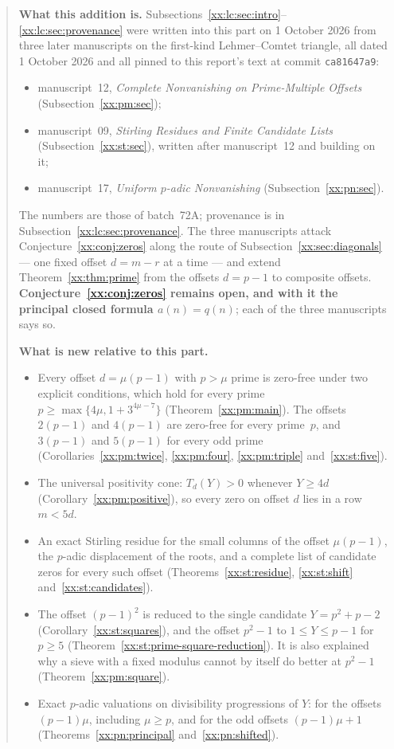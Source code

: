 \documentclass[11pt,a4paper]{article}
\numberwithin{equation}{section}
\theoremstyle{definition}
\theoremstyle{remark}
\theoremstyle{plain}
\begin{document}
\begin{quote}\small
\textbf{What this addition is.}
Subsections~\ref{xx:lc:sec:intro}--\ref{xx:lc:sec:provenance} were written
into this part on 1 October 2026 from three later manuscripts on the
first-kind Lehmer--Comtet triangle, all dated 1 October 2026 and all pinned to
this report's text at commit \texttt{ca81647a9}:
\begin{itemize}[leftmargin=1.4em,itemsep=1pt]
\item manuscript~12, \emph{Complete Nonvanishing on Prime-Multiple Offsets}
 (Subsection~\ref{xx:pm:sec});
\item manuscript~09, \emph{Stirling Residues and Finite Candidate Lists}
 (Subsection~\ref{xx:st:sec}), written after manuscript~12 and building on it;
\item manuscript~17, \emph{Uniform $p$-adic Nonvanishing}
 (Subsection~\ref{xx:pn:sec}).
\end{itemize}
The numbers are those of batch~72A; provenance is in
Subsection~\ref{xx:lc:sec:provenance}.  The three manuscripts attack
Conjecture~\ref{xx:conj:zeros} along the route of
Subsection~\ref{xx:sec:diagonals} --- one fixed offset $d=m-r$ at a time ---
and extend Theorem~\ref{xx:thm:prime} from the offsets $d=p-1$ to composite
offsets.  \textbf{Conjecture~\ref{xx:conj:zeros} remains open, and with it the
principal closed formula $a(n)=q(n)$}; each of the three manuscripts says so.

\smallskip
\textbf{What is new relative to this part.}
\begin{itemize}[leftmargin=1.4em,itemsep=1pt]
\item Every offset $d=\mu(p-1)$ with $p>\mu$ prime is zero-free under two
 explicit conditions, which hold for every prime
 $p\ge\max\{4\mu,1+3^{4\mu-7}\}$ (Theorem~\ref{xx:pm:main}).  The offsets
 $2(p-1)$ and $4(p-1)$ are zero-free for every prime~$p$, and $3(p-1)$ and
 $5(p-1)$ for every odd prime (Corollaries~\ref{xx:pm:twice},
 \ref{xx:pm:four}, \ref{xx:pm:triple} and~\ref{xx:st:five}).
\item The universal positivity cone: $T_d(Y)>0$ whenever $Y\ge4d$
 (Corollary~\ref{xx:pm:positive}), so every zero on offset $d$ lies in a row
 $m<5d$.
\item An exact Stirling residue for the small columns of the offset
 $\mu(p-1)$, the $p$-adic displacement of the roots, and a complete list of
 candidate zeros for every such offset
 (Theorems~\ref{xx:st:residue}, \ref{xx:st:shift} and~\ref{xx:st:candidates}).
\item The offset $(p-1)^2$ is reduced to the single candidate $Y=p^2+p-2$
 (Corollary~\ref{xx:st:squares}), and the offset $p^2-1$ to $1\le Y\le p-1$
 for $p\ge5$ (Theorem~\ref{xx:st:prime-square-reduction}).  It is also explained
 why a sieve with a fixed modulus cannot by itself do better at $p^2-1$
 (Theorem~\ref{xx:pm:square}).
\item Exact $p$-adic valuations on divisibility progressions of $Y$: for the
 offsets $(p-1)\mu$, including $\mu\ge p$, and for the odd offsets
 $(p-1)\mu+1$ (Theorems~\ref{xx:pn:principal} and~\ref{xx:pn:shifted}).
\end{itemize}


\end{quote}
\end{document}
